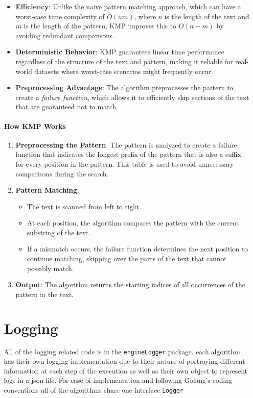 \begin{itemize}
    \item \textbf{Efficiency}: Unlike the naive pattern matching approach, which can have a worst-case time complexity of \(O(nm)\), where \(n\) is the length of the text and \(m\) is the length of the pattern, KMP improves this to \(O(n + m)\) by avoiding redundant comparisons.
    \item \textbf{Deterministic Behavior}: KMP guarantees linear time performance regardless of the structure of the text and pattern, making it reliable for real-world datasets where worst-case scenarios might frequently occur.
    \item \textbf{Preprocessing Advantage}: The algorithm preprocesses the pattern to create a \textit{failure function}, which allows it to efficiently skip sections of the text that are guaranteed not to match.
\end{itemize}

\paragraph{How KMP Works}
\begin{enumerate}
    \item \textbf{Preprocessing the Pattern}: The pattern is analyzed to create a failure function that indicates the longest prefix of the pattern that is also a suffix for every position in the pattern. This table is used to avoid unnecessary comparisons during the search.
    \item \textbf{Pattern Matching}:
    \begin{itemize}
        \item The text is scanned from left to right.
        \item At each position, the algorithm compares the pattern with the current substring of the text.
        \item If a mismatch occurs, the failure function determines the next position to continue matching, skipping over the parts of the text that cannot possibly match.
    \end{itemize}
    \item \textbf{Output}: The algorithm returns the starting indices of all occurrences of the pattern in the text.
\end{enumerate}

\section{Logging}
All of the logging related code is in the \texttt{engineLogger} package. each algorithm has their own logging implementation due to their nature of portraying different information at each step of the execution as well as their own object to represent logs in a json file. For ease of implementation and following Golang's coding conventions all of the algorithms share one interface \texttt{Logger} 

